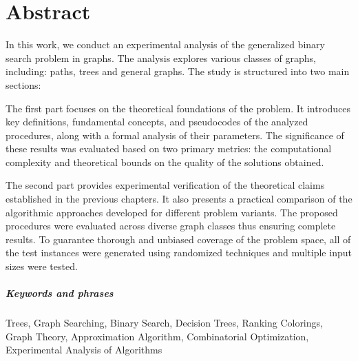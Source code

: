 \chapter*{Abstract}

In this work, we conduct an experimental analysis of the generalized binary search problem in graphs. 
The analysis explores various classes of graphs, including: paths, trees and general graphs. The study is structured into two main sections:

The first part focuses on the theoretical foundations of the problem. It introduces key definitions, fundamental concepts, and pseudocodes of the analyzed procedures, along with a formal analysis of their parameters. The significance of these results was evaluated based on two primary metrics: the computational complexity and theoretical bounds on the quality of the solutions obtained.

The second part provides experimental verification of the theoretical claims established in the previous chapters. It also presents a practical comparison of the algorithmic approaches developed for different problem variants. The proposed procedures were evaluated across diverse graph classes thus ensuring complete results. To guarantee thorough and unbiased coverage of the problem space, all of the test instances were generated using randomized techniques and multiple input sizes were tested.

\paragraph{Keywords and phrases} Trees, Graph Searching, Binary Search, Decision Trees, Ranking Colorings, Graph
Theory, Approximation Algorithm, Combinatorial Optimization, Experimental Analysis of Algorithms
